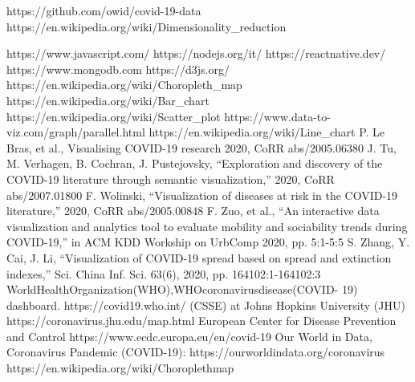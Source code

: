 \documentclass[10pt,conference]{IEEEtran}
\begin{document}
\begin{thebibliography}{00}

 https://github.com/owid/covid-19-data
 https://en.wikipedia.org/wiki/Dimensionality\_reduction

 https://www.javascript.com/
 https://nodejs.org/it/
 https://reactnative.dev/
 https://www.mongodb.com
 https://d3js.org/
 https://en.wikipedia.org/wiki/Choropleth\_map
 https://en.wikipedia.org/wiki/Bar\_chart
 https://en.wikipedia.org/wiki/Scatter\_plot
 https://www.data-to-viz.com/graph/parallel.html
 https://en.wikipedia.org/wiki/Line\_chart
 P. Le Bras, et al., Visualising COVID-19 research 2020, CoRR abs/2005.06380
 J. Tu, M. Verhagen, B. Cochran, J. Pustejovsky, “Exploration and discovery of the COVID-19 literature through semantic visualization,” 2020, CoRR abs/2007.01800
 F. Wolinski, “Visualization of diseases at risk in the COVID-19 literature,” 2020, CoRR abs/2005.00848
 F. Zuo, et al., “An interactive data visualization and analytics tool to evaluate mobility and sociability trends during COVID-19,” in ACM KDD Workship on UrbComp 2020, pp. 5:1-5:5
 S. Zhang, Y. Cai, J. Li, “Visualization of COVID-19 spread based on spread and extinction indexes,” Sci. China Inf. Sci. 63(6), 2020, pp. 164102:1-164102:3
 WorldHealthOrganization(WHO),WHOcoronavirusdisease(COVID- 19) dashboard. https://covid19.who.int/
 (CSSE) at Johns Hopkins University (JHU) https://coronavirus.jhu.edu/map.html
 European Center for Disease Prevention and Control https://www.ecdc.europa.eu/en/covid-19
 Our World in Data, Coronavirus Pandemic (COVID-19): https://ourworldindata.org/coronavirus 
 https://en.wikipedia.org/wiki/Choroplethmap

\end{thebibliography}
\end{document}
